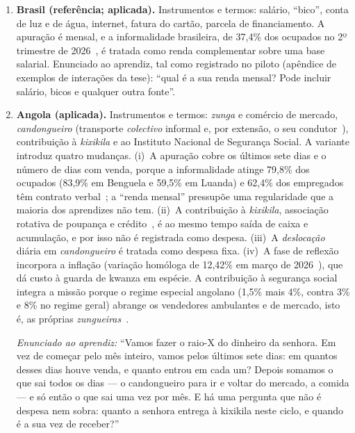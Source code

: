 \begin{enumerate}
\item[(a)] \textbf{Brasil (referência; aplicada).} Instrumentos e termos: salário, ``bico'', conta de luz e de água, internet, fatura do cartão, parcela de financiamento. A apuração é mensal, e a informalidade brasileira, de 37,4\% dos ocupados no 2º trimestre de 2026~\cite{ibge2026pnad}, é tratada como renda complementar sobre uma base salarial. Enunciado ao aprendiz, tal como registrado no piloto (apêndice de exemplos de interações da tese): ``qual é a sua renda mensal? Pode incluir salário, bicos e qualquer outra fonte''.

\item[(b)] \textbf{Angola (aplicada).} Instrumentos e termos: \textit{zunga} e comércio de mercado, \textit{candongueiro} (transporte \textit{colectivo} informal e, por extensão, o seu condutor~\cite{lopes2006candongueiros}), contribuição à \textit{kixikila} e ao Instituto Nacional de Segurança Social. A variante introduz quatro mudanças. (i)~A apuração cobre os últimos sete dias e o número de dias com venda, porque a informalidade atinge 79,8\% dos ocupados (83,9\% em Benguela e 59,5\% em Luanda) e 62,4\% dos empregados têm contrato verbal~\cite{ineangola2024emprego}; a ``renda mensal'' pressupõe uma regularidade que a maioria dos aprendizes não tem. (ii)~A contribuição à \textit{kixikila}, associação rotativa de poupança e crédito~\cite{carlos2014kixikila,ardener1964}, é ao mesmo tempo saída de caixa e acumulação, e por isso não é registrada como despesa. (iii)~A \textit{deslocação} diária em \textit{candongueiro} é tratada como despesa fixa. (iv)~A fase de reflexão incorpora a inflação (variação homóloga de 12,42\% em março de 2026~\cite{ineangola2026ipcn}), que dá custo à guarda de kwanza em espécie. A contribuição à segurança social integra a missão porque o regime especial angolano (1,5\% mais 4\%, contra 3\% e 8\% no regime geral) abrange os vendedores ambulantes e de mercado, isto é, as próprias \textit{zungueiras}~\cite{maptss2026inss}.

\noindent\textit{Enunciado ao aprendiz:} ``Vamos fazer o raio-X do dinheiro da senhora. Em vez de começar pelo mês inteiro, vamos pelos últimos sete dias: em quantos desses dias houve venda, e quanto entrou em cada um? Depois somamos o que sai todos os dias --- o candongueiro para ir e voltar do mercado, a comida --- e só então o que sai uma vez por mês. E há uma pergunta que não é despesa nem sobra: quanto a senhora entrega à kixikila neste ciclo, e quando é a sua vez de receber?''


\end{enumerate}
